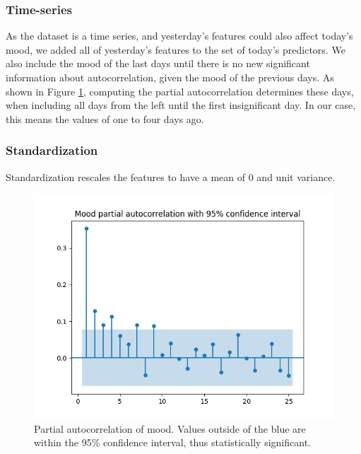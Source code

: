 \documentclass[conference]{IEEEtran}
\begin{document}
\subsubsection{Time-series} 
\label{sec:time-series}
As the dataset is a time series, and yesterday's features could also affect today's mood, we added all of yesterday's features to the set of today's predictors.
We also include the mood of the last days until there is no new significant information about autocorrelation, given the mood of the previous days.
As shown in Figure \ref{fig:partial_auto_corr}, computing the partial autocorrelation\cite{durre_robust_2015} determines these days, when including all days from the left until the first insignificant day.
In our case, this means the values of one to four days ago.


\subsubsection{Standardization}
Standardization rescales the features to have a mean of 0 and unit variance.


\begin{figure}[htbp]
\begin{center}
\includegraphics[width=1\linewidth]{figs/partial_autocorrelation_025lags_Mood.png}
\caption[]{Partial autocorrelation of mood. Values outside of the blue are within the 95\% confidence interval, thus statistically significant.}
\label{fig:partial_auto_corr}
\end{center}
\end{figure}
\end{document}
